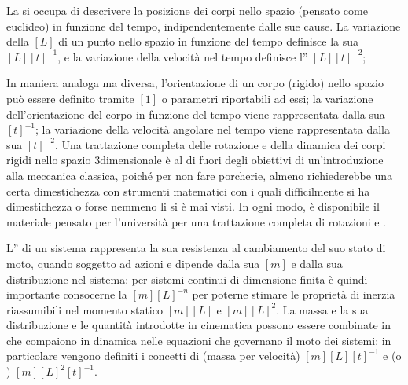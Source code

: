 \documentclass[letterpaper,10pt,italian]{jupyterBook}
\begin{document}
\sphinxAtStartPar
La  si occupa di descrivere la posizione dei corpi nello spazio (pensato come euclideo) in funzione del tempo, indipendentemente dalle sue cause. La variazione della  \([L]\) di un punto nello spazio in funzione del tempo definisce la sua  \([L][t]^{-1}\), e la variazione della velocità nel tempo definisce l” \([L][t]^{-2}\);%
\begin{footnote}[1]\sphinxAtStartFootnote
In maniera analoga ma diversa, l’orientazione di un corpo (rigido) nello spazio può essere definito tramite  \([1]\) o parametri riportabili ad essi; la variazione dell’orientazione del corpo in funzione del tempo viene rappresentata dalla sua  \([t]^{-1}\); la variazione della velocità angolare nel tempo viene rappresentata dalla sua  \([t]^{-2}\). Una trattazione completa delle rotazione e della dinamica dei corpi rigidi nello spazio 3\sphinxhyphen{}dimensionale è al di fuori degli obiettivi di un’introduzione alla meccanica classica, poiché \sphinxhyphen{} per non fare porcherie, almeno \sphinxhyphen{} richiederebbe una certa dimestichezza con strumenti matematici con i quali difficilmente si ha dimestichezza \sphinxhyphen{} o forse nemmeno li si è mai visti. In ogni modo, è disponibile il materiale pensato per l’università per una trattazione completa di rotazioni e .
%
\end{footnote}

\sphinxAtStartPar
L” di un sistema rappresenta la sua resistenza al cambiamento del suo stato di moto, quando soggetto ad azioni e dipende dalla sua  \([m]\) e dalla sua distribuzione nel sistema: per sistemi continui di dimensione finita è quindi importante consocerne la  \([m][L]^{-n}\) per poterne stimare le proprietà di inerzia riassumibili nel momento statico \([m][L]\) e  \([m][L]^2\). La massa \sphinxhyphen{} e la sua distribuzione \sphinxhyphen{} e le quantità introdotte in cinematica possono essere combinate in  che compaiono in dinamica nelle equazioni che governano il moto dei sistemi: in particolare vengono definiti i concetti di  (massa per velocità) \([m][L][t]^{-1}\) e  (o ) \([m][L]^2[t]^{-1}\).
\end{document}
